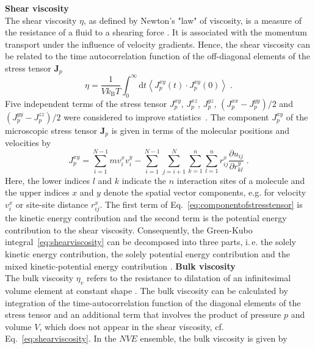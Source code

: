 \newline \newline
\textbf{Shear viscosity}\\
The shear viscosity $\eta$, as defined by Newton's "law" of viscosity, is a measure of the resistance of a fluid to a shearing force \parencite{Hoheisel1994}. It is associated with the momentum transport under the influence of velocity gradients. Hence, the shear viscosity can be related to the time autocorrelation function of the off-diagonal elements of the stress tensor $\textbf{J}_{p}$ \parencite{Gubbins1972}
\begin{equation}
\eta=\frac{1}{Vk_{\text{B}}T} \int^{\infty}_{0} \mathrm dt \left\langle J^{xy}_{p}\left(t\right) \cdot J^{xy}_{p}\left(0\right)\right\rangle \;.
\label{eq:shearviscosity}
\end{equation}
Five independent terms of the stress tensor $J_p^{xy}$, $J_p^{xz}$, $J_p^{yz}$, $(J_p^{xx}-J_p^{yy})/2$ and $(J_p^{yy}-J_p^{zz})/2$ were considered to improve statistics~\cite{Alfe1998}. The component $J^{xy}_{p}$ of the microscopic stress tensor $\textbf{J}_{p}$ is given in terms of the molecular positions and velocities by \parencite{Hoheisel1994}
\begin{equation}
J^{xy}_{p}=\sum^{N-1}_{i=1} mv^{x}_{i}v^{y}_{i}-\sum^{N-1}_{i=1}\sum^{N}_{j=i+1}\sum^{n}_{k=1}\sum^{n}_{l=1} r^{x}_{ij} \frac{\partial u_{ij}}{\partial r^{y}_{kl}} \;.
\label{eq:componentofstresstensor}
\end{equation}
Here, the lower indices $l$ and $k$ indicate the $n$ interaction sites of a molecule and the upper indices $x$ and $y$ denote the spatial vector components, e.g. for velocity $v^{x}_{i}$ or site-site distance $r^{x}_{ij}$. The first term of Eq.~\eqref{eq:componentofstresstensor} is the kinetic energy contribution and the second term is the potential energy contribution to the shear viscosity. Consequently, the Green-Kubo integral~\eqref{eq:shearviscosity} can be decomposed into three parts, i.\,e. the solely kinetic energy contribution, the solely potential energy contribution and the mixed kinetic-potential energy contribution \parencite{Hoheisel1994}.
\newline \newline
\textbf{Bulk viscosity}\\
The bulk viscosity $\eta_{v}$ refers to the resistance to dilatation of an infinitesimal volume element at constant shape \parencite{Barton1998}. The bulk viscosity can be calculated by integration of the time-autocorrelation function of the diagonal elements of the stress tensor and an additional term that involves the product of pressure $p$ and volume $V$, which does not appear in the shear viscosity, cf. Eq.~\eqref{eq:shearviscosity}. In the $NVE$ ensemble, the bulk viscosity is given by \parencite{Gubbins1972,Steele1969}
